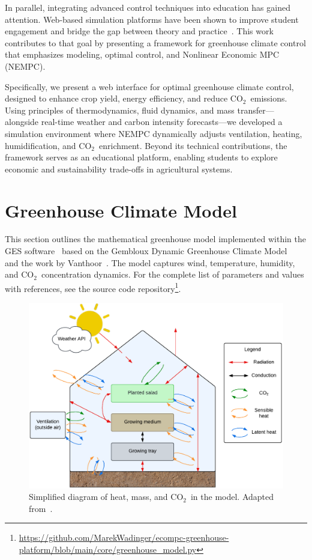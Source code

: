 \documentclass[conference]{IEEEtran}
\newcommand{\coo}{\ensuremath{\mathrm{CO_2}}}
\begin{document}
In parallel, integrating advanced control techniques into education has gained attention. Web-based simulation platforms have been shown to improve student engagement and bridge the gap between theory and practice~\cite{WangEducation2024, Zakova2024}. This work contributes to that goal by presenting a framework for greenhouse climate control that emphasizes modeling, optimal control, and Nonlinear Economic MPC (NEMPC).

Specifically, we present a web interface for optimal greenhouse climate control, designed to enhance crop yield, energy efficiency, and reduce \coo\ emissions. Using principles of thermodynamics, fluid dynamics, and mass transfer—alongside real-time weather and carbon intensity forecasts—we developed a simulation environment where NEMPC dynamically adjusts ventilation, heating, humidification, and \coo\ enrichment. Beyond its technical contributions, the framework serves as an educational platform, enabling students to explore economic and sustainability trade-offs in agricultural systems.

\section{Greenhouse Climate Model}
\label{sec:greenhouse}
This section outlines the mathematical greenhouse model implemented within the GES software~\cite{Ward2019} based on the Gembloux Dynamic Greenhouse Climate Model~\cite{Mashonjowa2007} and the work by Vanthoor~\cite{Vanthoor2011}. The model captures wind, temperature, humidity, and \coo\ concentration dynamics. For the complete list of parameters and values with references, see the source code repository\footnote{\url{https://github.com/MarekWadinger/ecompc-greenhouse-platform/blob/main/core/greenhouse_model.py}}.
\begin{figure}
    \centering
    \includegraphics[width=\linewidth]{figures/diagramGH.pdf}
    \caption{Simplified diagram of heat, mass, and \coo\ in the model. Adapted from~\cite{Ward2019}.}\label{fig:diagram}
\end{figure}
\end{document}
